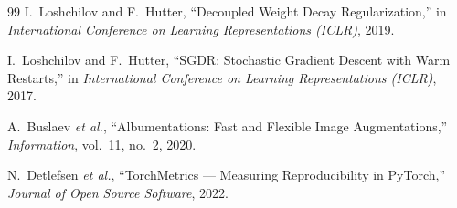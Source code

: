 \documentclass[11pt,a4paper]{article}
\begin{document}
\begin{thebibliography}{99}
I.~Loshchilov and F.~Hutter,
``Decoupled Weight Decay Regularization,''
in \emph{International Conference on Learning Representations (ICLR)}, 2019.

I.~Loshchilov and F.~Hutter,
``SGDR: Stochastic Gradient Descent with Warm Restarts,''
in \emph{International Conference on Learning Representations (ICLR)}, 2017.

A.~Buslaev \emph{et al.},
``Albumentations: Fast and Flexible Image Augmentations,''
\emph{Information}, vol.~11, no.~2, 2020.

N.~Detlefsen \emph{et al.},
``TorchMetrics --- Measuring Reproducibility in PyTorch,''
\emph{Journal of Open Source Software}, 2022.

\end{thebibliography}
\end{document}
